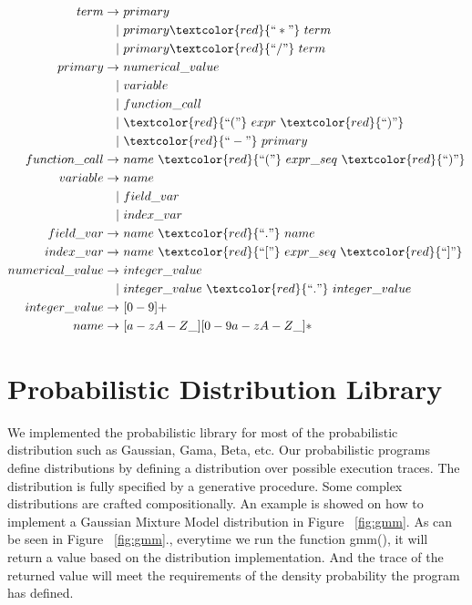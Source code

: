 \begin{align*}             
             term \rightarrow & ~primary \\  
                   |& ~primary \textcolor{red}{``*"} ~term \\
                   |& ~primary \textcolor{red}{``/"} ~term \\
          primary \rightarrow & ~numerical\_value \\
                   |& ~variable \\
                   |& ~function\_call \\
                   |& ~\textcolor{red}{``("} ~expr ~\textcolor{red}{``)"} \\
                   |& ~\textcolor{red}{``-"} ~primary \\           
    function\_call \rightarrow & ~name ~\textcolor{red}{``("} ~expr\_seq ~\textcolor{red}{``)"} \\           
         variable \rightarrow & ~name \\
                   |& ~field\_var \\
                   |& ~index\_var \\              
        field\_var \rightarrow & ~name ~\textcolor{red}{``."} ~name \\
        index\_var \rightarrow & ~name ~\textcolor{red}{``["} ~expr\_seq ~\textcolor{red}{``]"} \\           
  numerical\_value \rightarrow & ~integer\_value \\
                   |& ~integer\_value ~\textcolor{red}{``."} ~integer\_value \\                  
    integer\_value \rightarrow & ~[0-9]+ \\            
             name \rightarrow & ~[a-zA-Z\_][0-9a-zA-Z\_]*
\end{align*}

\section{Probabilistic Distribution Library}
\label{sec:distr}
We implemented the probabilistic library for most of the probabilistic distribution such as Gaussian, Gama, Beta, etc. Our probabilistic programs define distributions by defining a distribution over possible execution traces. The distribution is fully specified by a generative procedure. Some complex distributions are crafted compositionally. An example is showed on how to implement a Gaussian Mixture Model distribution in Figure ~\ref{fig:gmm}. As can be seen in Figure ~\ref{fig:gmm}., everytime we run the function gmm(), it will return a value based on the distribution implementation. And the trace of the returned value will meet the requirements of the density probability the program has defined.

